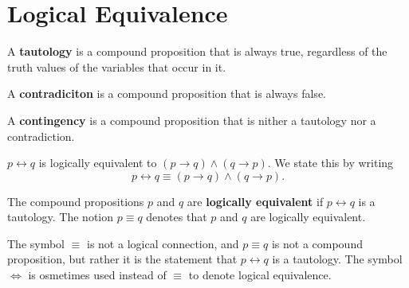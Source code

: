 \section{Logical Equivalence}
\begin{defn}
  A \textbf{tautology} is a compound proposition that is always true, regardless of the truth values of the variables that occur in it.
\end{defn}
\begin{defn}
  A \textbf{contradiciton} is a compound proposition that is always false.
\end{defn}
\begin{defn}
  A \textbf{contingency} is a compound proposition that is nither a tautology nor a contradiction.
\end{defn}
\begin{ex}
  \( p \leftrightarrow q \) is logically equivalent to \( (p \to q) \wedge (q \to p)\).
  We state this by writing
  \[ p \leftrightarrow q \equiv (p \to q) \wedge (q \to p).\]
\end{ex}
\begin{table}  \centering
  \caption{The truth table for \((p \lor \neg q) \to (p \land q)\)}
\end{table}
\begin{defn}
  The compound propositions \(p\) and \(q\) are \textbf{logically equivalent} if \(p \leftrightarrow q\) is a tautology.
  The notion \(p \equiv q\) denotes that \(p\) and \(q\) are logically equivalent.
  \begin{remark}
    The symbol \(\equiv\) is not a logical connection, and \(p\equiv q\) is not a compound proposition,
    but rather it is the statement that \(p \leftrightarrow q\) is a tautology.
    The symbol \(\iff\) is osmetimes used instead of \(\equiv\) to denote logical equivalence.
  \end{remark}
\end{defn}

